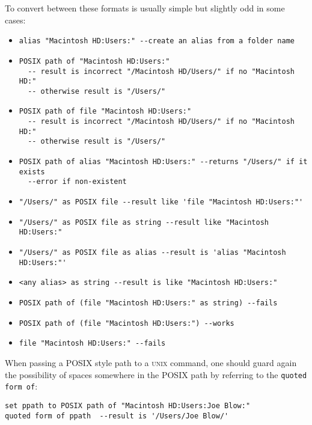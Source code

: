 \documentclass[11pt]{amsart}
\def\UNIX{\textsc{unix}\xspace}
\begin{document}
To convert between these formats is usually simple but slightly odd in some cases:
\begin{itemize}
\item
\begin{verbatim}
alias "Macintosh HD:Users:" --create an alias from a folder name
\end{verbatim}
\item
\begin{verbatim}
POSIX path of "Macintosh HD:Users:"
  -- result is incorrect "/Macintosh HD/Users/" if no "Macintosh HD:"
  -- otherwise result is "/Users/"
\end{verbatim}
\item
\begin{verbatim}
POSIX path of file "Macintosh HD:Users:"
  -- result is incorrect "/Macintosh HD/Users/" if no "Macintosh HD:"
  -- otherwise result is "/Users/"
\end{verbatim}
\item
\begin{verbatim}
POSIX path of alias "Macintosh HD:Users:" --returns "/Users/" if it exists
  --error if non-existent
\end{verbatim}
\item
\begin{verbatim}
"/Users/" as POSIX file --result like 'file "Macintosh HD:Users:"'
\end{verbatim}
\item
\begin{verbatim}
"/Users/" as POSIX file as string --result like "Macintosh HD:Users:"
\end{verbatim}
\item
\begin{verbatim}
"/Users/" as POSIX file as alias --result is 'alias "Macintosh HD:Users:"'
\end{verbatim}
\item
\begin{verbatim}
<any alias> as string --result is like "Macintosh HD:Users:"
\end{verbatim}
\item
\begin{verbatim}
POSIX path of (file "Macintosh HD:Users:" as string) --fails
\end{verbatim}
\item
\begin{verbatim}
POSIX path of (file "Macintosh HD:Users:") --works
\end{verbatim}
\item
\begin{verbatim}
file "Macintosh HD:Users:" --fails
\end{verbatim}
\end{itemize}
When passing a POSIX style path to a \UNIX command, one should guard again the possibility of spaces somewhere in the POSIX path by referring to the {\tt quoted form of}:
\begin{verbatim}
set ppath to POSIX path of "Macintosh HD:Users:Joe Blow:"
quoted form of ppath  --result is '/Users/Joe Blow/'
\end{verbatim}
\end{document}
